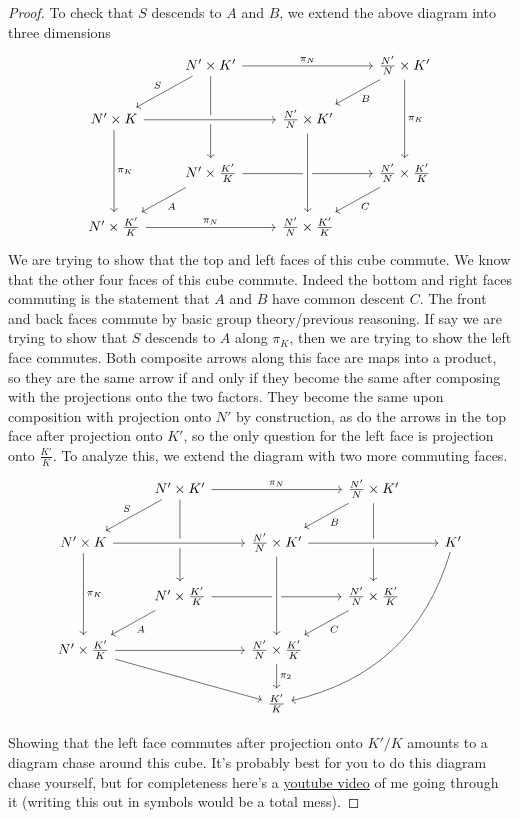 \documentclass[12nt]{article}
\theoremstyle{plain}
\begin{document}
\begin{proof}
To check that $S$ descends to $A$ and $B$, we extend the above diagram into three dimensions
\[
\begin{tikzcd}
 & N' \times K' \ar[dl, "S"'] \ar[rr, "\pi_N"] \ar[dd] & & \frac{N'}{N}  \times K' \ar[dl, "B"] \ar[dd, "\pi_K"] \\
 N' \times K \ar[rr, crossing over] \ar[dd, "\pi_K"] & & \frac{N'}{N} \times K'  \\
 & N' \times \frac{K'}{K} \ar[dl, "A"] \ar[rr] & & \frac{N'}{N} \times \frac{K'}{K} \ar[dl, "C"] \\
 N' \times \frac{K'}{K} \ar[rr, "\pi_N"] & & \frac{N'}{N} \times \frac{K'}{K} \ar[from=2-3, crossing over]
\end{tikzcd} 
\]
We are trying to show that the top and left faces of this cube commute. We know that the other four faces of this cube commute. Indeed the bottom and right faces commuting is the statement that $A$ and $B$ have common descent $C$. The front and back faces commute by basic group theory/previous reasoning. If say we are trying to show that $S$ descends to $A$ along $\pi_K$, then we are trying to show the left face commutes. Both composite arrows along this face are maps into a product, so they are the same arrow if and only if they become the same after composing with the projections onto the two factors. They become the same upon composition with projection onto $N'$ by construction, as do the arrows in the top face after projection onto $K'$, so the only question for the left face is projection onto $\frac{K'}{K}$. To analyze this, we extend the diagram with two more commuting faces.
\[
\begin{tikzcd}
 & N' \times K' \ar[dl, "S"'] \ar[rr, "\pi_N"] \ar[dd] & & \frac{N'}{N}  \times K' \ar[dl, "B"] \ar[dd] \\
 N' \times K \ar[rr, crossing over] \ar[dd, "\pi_K"] & & \frac{N'}{N} \times K' \ar[rr, crossing over] & & K' \ar[dddll, bend left] \\
 & N' \times \frac{K'}{K} \ar[dl, "A"] \ar[rr] & & \frac{N'}{N} \times \frac{K'}{K} \ar[dl, "C"] \\
 N' \times \frac{K'}{K} \ar[rr] \ar[drr] & & \frac{N'}{N} \times \frac{K'}{K} \ar[d, "\pi_2"] \ar[from=2-3, crossing over] \\
  & & \frac{K'}{K}
\end{tikzcd} 
\]

Showing that the left face commutes after projection onto $K'/K$ amounts to a diagram chase around this cube. It's probably best for you to do this diagram chase yourself, but for completeness here's a \textcolor{blue}{\underline{\href{https://youtu.be/pygdsX-8r_o}{youtube video}}} of me going through it (writing this out in symbols would be a total mess).


\end{proof}
\end{document}
